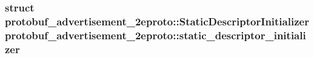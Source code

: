 \subsubsection[{\texorpdfstring{static\+\_\+descriptor\+\_\+initializer}{static_descriptor_initializer}}]{\setlength{\rightskip}{0pt plus 5cm}struct {\bf protobuf\+\_\+advertisement\+\_\+2eproto\+::\+Static\+Descriptor\+Initializer}  protobuf\+\_\+advertisement\+\_\+2eproto\+::static\+\_\+descriptor\+\_\+initializer}\hypertarget{namespaceprotobuf__advertisement__2eproto_afc3c0155f686268d98d8bb107c19e3fb}{}\label{namespaceprotobuf__advertisement__2eproto_afc3c0155f686268d98d8bb107c19e3fb}
